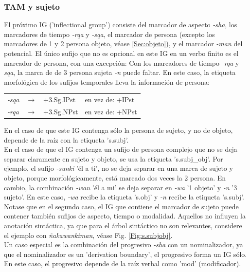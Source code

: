 \documentclass[a4paper,11pt,DIV12]{scrartcl}
\begin{document}
  \subsubsection{TAM y sujeto}\label{Sec:TAM}
El pr\'oximo IG ('inflectional group') consiste del marcador de aspecto {\em -sha}, los marcadores de tiempo {\em -rqa} y {\em -sqa}, el marcador de persona (excepto los marcadores de 1{\textordfeminine} y 2{\textordfeminine} persona objeto, v\'ease \ref{Sec:objeto}), y el marcador {\em -man} del potencial.
El \'unico sufijo que no es opcional en este IG en un verbo finito es el marcador de persona, con una excepci\'on: Con los marcadores de tiempo {\em -rqa} y {\em -sqa}, la marca de de 3{\textordfeminine} persona sujeta {\em -n} puede faltar. En este caso, la etiqueta morfol\'ogica de los sufijos temporales lleva la informaci\'on de persona:
\begin{center}
\begin{tabular}{llll}
\toprule
{\em-sqa} & $\rightarrow$ & +3.Sg.IPst & en vez de: +IPst\\
{\em-rqa} & $\rightarrow$ & +3.Sg.NPst  & en vez de: +NPst\\
\bottomrule
\end{tabular}
\end{center}

En el caso de que este IG contenga s\'olo la persona de sujeto, y no de objeto, depende de la ra\'iz con la etiqueta 's.subj'.\\
En el caso de que el IG contenga un sufijo de persona complejo que no se deja separar claramente en sujeto y objeto, se usa la etiqueta 's.subj\_obj'. Por ejemplo, el sufijo {\em -sunki} '\'el a ti', no se deja separar en una marca de sujeto y objeto, porque morfol\'ogicamente, est\'a marcado dos veces la 2{\textordfeminine} persona. En cambio, la combinaci\'on {\em -wan} '\'el a mi' se deja separar en {\em -wa} '1{\textordfeminine} objeto' y {\em -n} '3{\textordfeminine} sujeto'. En este caso, {\em -wa} recibe la etiqueta 's.obj' y {\em -n} recibe la etiqueta 's.subj'.\\
Notase que en el segundo caso, el IG que contiene el marcador de sujeto puede contener tambi\'en sufijos de aspecto, tiempo o modalidad. Aquellos no influyen la anotaci\'on sint\'actica, ya que para el \'arbol sint\'actico no son relevantes, considere el ejemplo con {\em \~nakawankiman}, v\'ease Fig. \ref{Fig:s.subjobj}.\\
Un caso especial es la combinaci\'on del progresivo {\em -sha} con un nominalizador, ya que el nominalizador es un 'derivation boundary', el progresivo forma un IG s\'olo. En este caso, el progresivo depende de la ra\'iz verbal como 'mod' (modificador).
\end{document}
